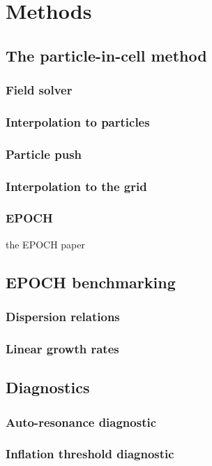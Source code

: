 \chapter{Methods}
\label{chp:methods}

\section{The particle-in-cell method}
\subsection{Field solver}
\subsection{Interpolation to particles}
\subsection{Particle push}
\subsection{Interpolation to the grid}
\subsection{EPOCH}
the EPOCH paper\cite{Arber2015}

\section{EPOCH benchmarking}
\subsection{Dispersion relations}
\subsection{Linear growth rates}




\section{Diagnostics}
\subsection{Auto-resonance diagnostic}
\subsection{Inflation threshold diagnostic}

%
%
